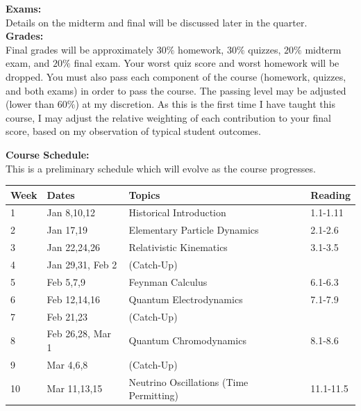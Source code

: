 \documentclass[12pt]{article}
\begin{document}
\noindent
\noindent
\textbf{Exams:}\\
Details on the midterm and final will be discussed later in the quarter.\\[3pt]

\noindent
\textbf {Grades:}\\
Final grades will be approximately $30\%$ homework, $30\%$ quizzes, $20\%$ midterm exam, 
and $20\%$ final exam. Your worst quiz score and worst homework will be dropped.  
You must also pass each component of the course (homework, quizzes, and both exams) in order to pass the course.  The passing level may be adjusted (lower than $60\%$) at my discretion. As this is the first time I have taught this course, I may adjust the relative weighting of each contribution to your final score, based on my observation of typical student outcomes.\\
\noindent


\noindent
\textbf {Course Schedule:}\\
This is a preliminary schedule which will evolve as the course progresses.\\

\noindent
\begin{tabular}{llll}
\textbf{Week} & \textbf{Dates} & \textbf{Topics} & \textbf{Reading} \\
\hline
1  & Jan 8,10,12      & Historical Introduction & 1.1-1.11    \\
\hline
2  & Jan 17,19        & Elementary Particle Dynamics & 2.1-2.6 \\
\hline
3  & Jan 22,24,26     & Relativistic Kinematics & 3.1-3.5    \\
\hline
4  & Jan 29,31, Feb 2 & (Catch-Up)    &     \\
\hline
5  & Feb 5,7,9        & Feynman Calculus  & 6.1-6.3    \\
\hline
6  & Feb 12,14,16     & Quantum Electrodynamics & 7.1-7.9     \\
\hline
7  & Feb 21,23        & (Catch-Up)    & \\
\hline
8  & Feb 26,28, Mar 1 & Quantum Chromodynamics &   8.1-8.6\\
\hline
9  & Mar 4,6,8        & (Catch-Up)   & \\
\hline
10 & Mar 11,13,15     & Neutrino Oscillations (Time Permitting) & 11.1-11.5\\
\hline
\end{tabular}\\ \vskip 1cm
\end{document}
